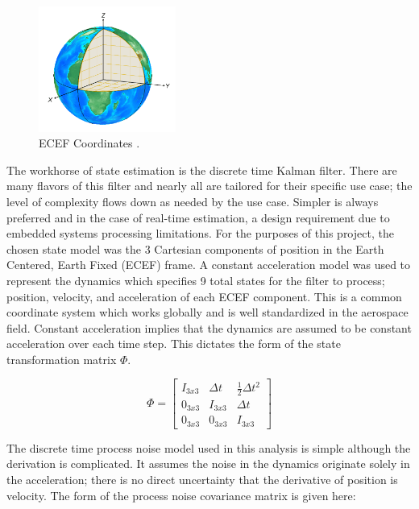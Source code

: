 \documentclass[conf]{new-aiaa}
\begin{document}
\begin{figure} %
    \centering
    \includegraphics[width=0.4\textwidth]{figures/ecef_system.png}
    \caption{ECEF Coordinates \cite{mathworks_ecef}.}
\end{figure}

The workhorse of state estimation is the discrete time Kalman filter. There are many flavors of this filter and nearly all are tailored for their specific use case; the level of complexity flows down as needed by the use case. Simpler is always preferred and in the case of real-time estimation, a design requirement due to embedded systems processing limitations. For the purposes of this project, the chosen state model was the 3 Cartesian components of position in the Earth Centered, Earth Fixed (ECEF) frame. A constant acceleration model was used to represent the dynamics which specifies 9 total states for the filter to process; position, velocity, and acceleration of each ECEF component. This is a common coordinate system which works globally and is well standardized in the aerospace field. Constant acceleration implies that the dynamics are assumed to be constant acceleration over each time step. This dictates the form of the state transformation matrix \(\Phi\). 

\begin{equation}
    \Phi = \begin{bmatrix} I_{3x3} & \Delta t & \frac{1}{2}\Delta t^{2} \\ 0_{3x3} & I_{3x3} & \Delta t \\ 0_{3x3} & 0_{3x3} & I_{3x3} \end{bmatrix}
\end{equation}

The discrete time process noise model used in this analysis is simple although the derivation is complicated. It assumes the noise in the dynamics originate solely in the acceleration; there is no direct uncertainty that the derivative of position is velocity. The form of the process noise covariance matrix is given here:
\end{document}
